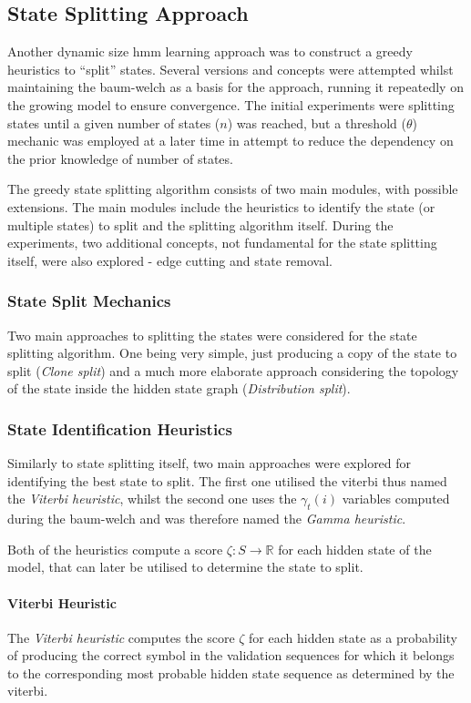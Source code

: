 \subsection{State Splitting Approach}

Another dynamic size \gls{hmm} learning approach was to construct a greedy heuristics to ``split'' states. Several versions and concepts were attempted whilst maintaining the \gls{baum-welch} as a basis for the approach, running it repeatedly on the growing model to ensure convergence. The initial experiments were splitting states until a given number of states ($n$) was reached, but a threshold ($\theta$) mechanic was employed at a later time in attempt to reduce the dependency on the prior knowledge of number of states.

The greedy state splitting algorithm consists of two main modules, with possible extensions. The main modules include the heuristics to identify the state (or multiple states) to split and the splitting algorithm itself. During the experiments, two additional concepts, not fundamental for the state splitting itself, were also explored - edge cutting and state removal.

\subsubsection{State Split Mechanics}
Two main approaches to splitting the states were considered for the state splitting algorithm. One being very simple, just producing a copy of the state to split (\emph{Clone split}) and a much more elaborate approach considering the topology of the state inside the hidden state graph (\emph{Distribution split}).

\subsubsection{State Identification Heuristics}
Similarly to state splitting itself, two main approaches were explored for identifying the best state to split. The first one utilised the \gls{viterbi} thus named the \emph{Viterbi heuristic}, whilst the second one uses the $\gamma_t(i)$ variables computed during the \gls{baum-welch} and was therefore named the \emph{Gamma heuristic}.

Both of the heuristics compute a score $\zeta:S \rightarrow \mathbb{R}$ for each hidden state of the model, that can later be utilised to determine the state to split.

\paragraph{Viterbi Heuristic}
The \emph{Viterbi heuristic} computes the score $\zeta$ for each hidden state as a probability of producing the correct symbol in the validation sequences for which it belongs to the corresponding most probable hidden state sequence as determined by the \gls{viterbi}.


